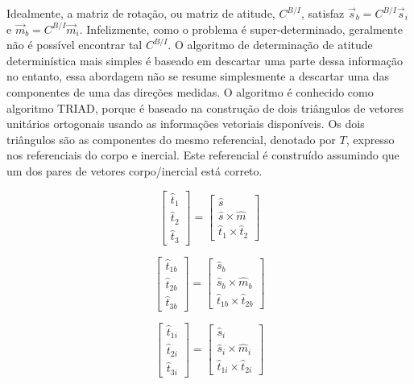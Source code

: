 Idealmente, a matriz de rotação, ou matriz de atitude, $C^{B/I}$, satisfaz $\vec{s}_b=C^{B/I}\vec{s}_i$ e $\vec{m}_b=C^{B/I}\vec{m}_i$. Infelizmente, como o problema é super-determinado, geralmente não é possível encontrar tal $C^{B/I}$. O algoritmo de determinação de atitude determinística mais simples é baseado em descartar uma parte dessa informação no entanto, essa abordagem não se resume simplesmente a descartar uma das componentes de uma das direções medidas. O algoritmo é conhecido como algoritmo TRIAD, porque é baseado na construção de dois triângulos de vetores unitários ortogonais usando as informações vetoriais disponíveis. Os dois triângulos são as componentes do mesmo referencial, denotado por $T$, expresso nos referenciais do corpo e inercial. Este referencial é construído assumindo que um dos pares de vetores corpo/inercial está correto.


\begin{equation}
\begin{bmatrix} \hat{t}_1 \\ \hat{t}_2 \\ \hat{t}_3
\end{bmatrix} = \begin{bmatrix} \hat{s} \\  \hat{s}\times\hat{m} 
\\ \hat{t}_1\times\hat{t}_2
\end{bmatrix}
\end{equation}

\begin{equation}
\begin{bmatrix} \hat{t}_{1b} \\ \hat{t}_{2b} \\ \hat{t}_{3b}
\end{bmatrix} = \begin{bmatrix} \hat{s}_b \\  \hat{s}_b\times\hat{m}_b 
\\ \hat{t}_{1b}\times\hat{t}_{2b}
\end{bmatrix}
\end{equation}

\begin{equation}
\begin{bmatrix} \hat{t}_{1i} \\ \hat{t}_{2i} \\ \hat{t}_{3i}
\end{bmatrix} = \begin{bmatrix} \hat{s}_i \\  \hat{s}_i\times\hat{m}_i
\\ \hat{t}_{1i}\times\hat{t}_{2i}
\end{bmatrix}
\end{equation}


